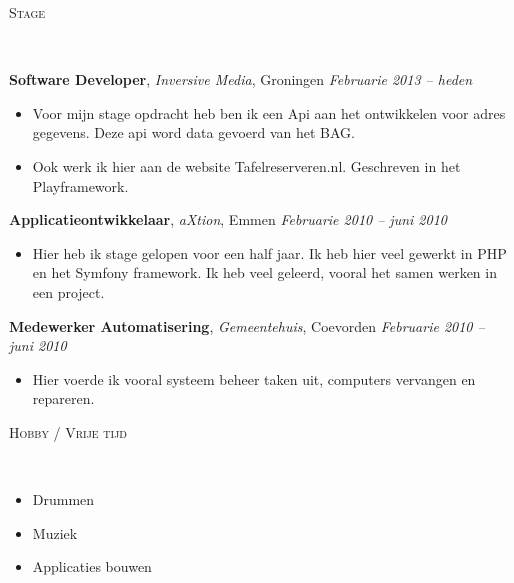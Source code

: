 \documentclass[9pt]{article}
\newenvironment{changemargin}[2]{%
  \begin{list}{}{%
    \setlength{\topsep}{0pt}%
    \setlength{\leftmargin}{#1}%
    \setlength{\rightmargin}{#2}%
    \setlength{\listparindent}{\parindent}%
    \setlength{\itemindent}{\parindent}%
    \setlength{\parsep}{\parskip}%
  }%
  \item[]}{\end{list}
}
\newcommand{\lineover}{
	\begin{changemargin}{-0.05in}{-0.05in}
		\vspace*{-8pt}
		\hrulefill \\
		\vspace*{-2pt}
	\end{changemargin}
}
\newcommand{\header}[1]{
	\begin{changemargin}{-0.5in}{-0.5in}
		\scshape{#1}\\
  	\lineover
	\end{changemargin}
}
\newenvironment{body} {
	\vspace*{-16pt}
	\begin{changemargin}{-0.25in}{-0.5in}
  }	
	{\end{changemargin}
}
\begin{document}
\smallskip

\newpage{} %

\header{Stage}

\begin{body}
	\vspace{14pt}
	\textbf{Software Developer}, \emph{Inversive Media}, Groningen \hfill \emph{Februarie 2013 -- heden}\\
	\vspace*{-4pt}
	\begin{itemize} \itemsep -0pt  %
		\item Voor mijn stage opdracht heb ben ik een Api aan het ontwikkelen voor adres gegevens. Deze api word data gevoerd van het BAG.
		\item Ook werk ik hier aan de website Tafelreserveren.nl. Geschreven in het Playframework.
	\end{itemize}

	\textbf {Applicatieontwikkelaar}, \emph{aXtion}, Emmen \hfill \emph{Februarie 2010 -- juni 2010}\\
	\vspace*{-4pt}
	\begin{itemize} \itemsep -0pt
		\item Hier heb ik stage gelopen voor  een half jaar. Ik heb hier veel gewerkt in PHP en het Symfony framework. Ik heb veel geleerd, vooral het samen werken in een project.
	\end{itemize}

	\textbf {Medewerker Automatisering}, \emph{Gemeentehuis}, Coevorden \hfill \emph{Februarie 2010 -- juni 2010}\\
	\vspace*{-4pt}
	\begin{itemize} \itemsep -0pt
		\item Hier voerde ik vooral systeem beheer taken uit, computers vervangen en repareren.  
	\end{itemize}
\end{body}

\smallskip


\header{Hobby / Vrije tijd}

\begin{body}
	\vspace{14pt}
	\begin{itemize} \itemsep -0pt  %
		\item Drummen
		\item Muziek
		\item Applicaties bouwen
	\end{itemize}

\end{body}

\smallskip


\smallskip
\end{document}
